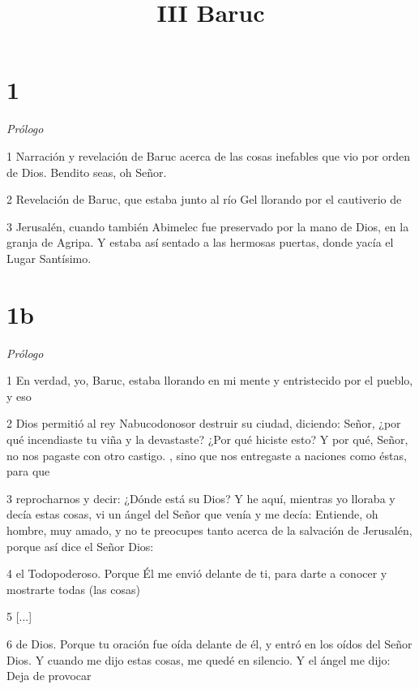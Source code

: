 

\title{III Baruc}

\chapter{1}

\par \textit{Prólogo}

\par 1 Narración y revelación de Baruc acerca de las cosas inefables que vio por orden de Dios. Bendito seas, oh Señor.

\par 2 Revelación de Baruc, que estaba junto al río Gel llorando por el cautiverio de

\par 3 Jerusalén, cuando también Abimelec fue preservado por la mano de Dios, en la granja de Agripa. Y estaba así sentado a las hermosas puertas, donde yacía el Lugar Santísimo.

\chapter{1b}

\par \textit{Prólogo}

\par 1 En verdad, yo, Baruc, estaba llorando en mi mente y entristecido por el pueblo, y eso

\par 2 Dios permitió al rey Nabucodonosor destruir su ciudad, diciendo: Señor, ¿por qué incendiaste tu viña y la devastaste? ¿Por qué hiciste esto? Y por qué, Señor, no nos pagaste con otro castigo. , sino que nos entregaste a naciones como éstas, para que

\par 3 reprocharnos y decir: ¿Dónde está su Dios? Y he aquí, mientras yo lloraba y decía estas cosas, vi un ángel del Señor que venía y me decía: Entiende, oh hombre, muy amado, y no te preocupes tanto acerca de la salvación de Jerusalén, porque así dice el Señor Dios:

\par 4 el Todopoderoso. Porque Él me envió delante de ti, para darte a conocer y mostrarte todas (las cosas)

\par 5 [...]

\par 6 de Dios. Porque tu oración fue oída delante de él, y entró en los oídos del Señor Dios. Y cuando me dijo estas cosas, me quedé en silencio. Y el ángel me dijo: Deja de provocar

